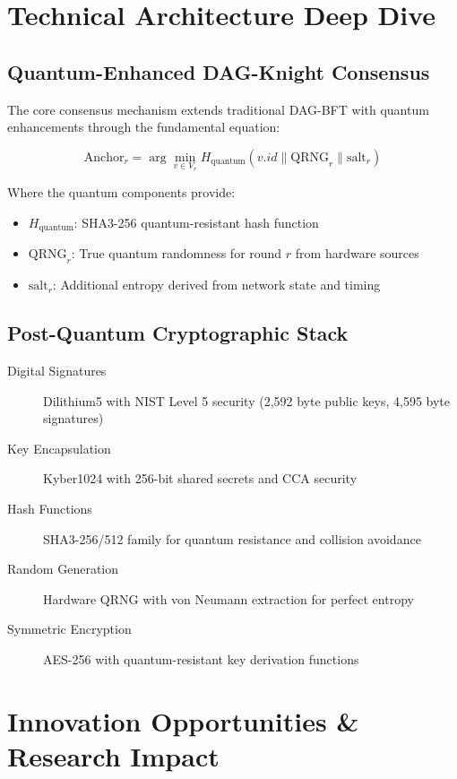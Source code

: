 \documentclass[11pt,a4paper]{article}
\begin{document}
\section{Technical Architecture Deep Dive}

\subsection{Quantum-Enhanced DAG-Knight Consensus}

The core consensus mechanism extends traditional DAG-BFT with quantum enhancements through the fundamental equation:

\begin{equation}
\text{Anchor}_r = \arg\min_{v \in V_r} H_{\text{quantum}}(v.id \parallel \text{QRNG}_r \parallel \text{salt}_r)
\end{equation}

Where the quantum components provide:
\begin{itemize}
\item $H_{\text{quantum}}$: SHA3-256 quantum-resistant hash function
\item $\text{QRNG}_r$: True quantum randomness for round $r$ from hardware sources
\item $\text{salt}_r$: Additional entropy derived from network state and timing
\end{itemize}

\subsection{Post-Quantum Cryptographic Stack}

\begin{description}
\item[Digital Signatures] Dilithium5 with NIST Level 5 security (2,592 byte public keys, 4,595 byte signatures)
\item[Key Encapsulation] Kyber1024 with 256-bit shared secrets and CCA security
\item[Hash Functions] SHA3-256/512 family for quantum resistance and collision avoidance
\item[Random Generation] Hardware QRNG with von Neumann extraction for perfect entropy
\item[Symmetric Encryption] AES-256 with quantum-resistant key derivation functions
\end{description}

\section{Innovation Opportunities \& Research Impact}
\end{document}
